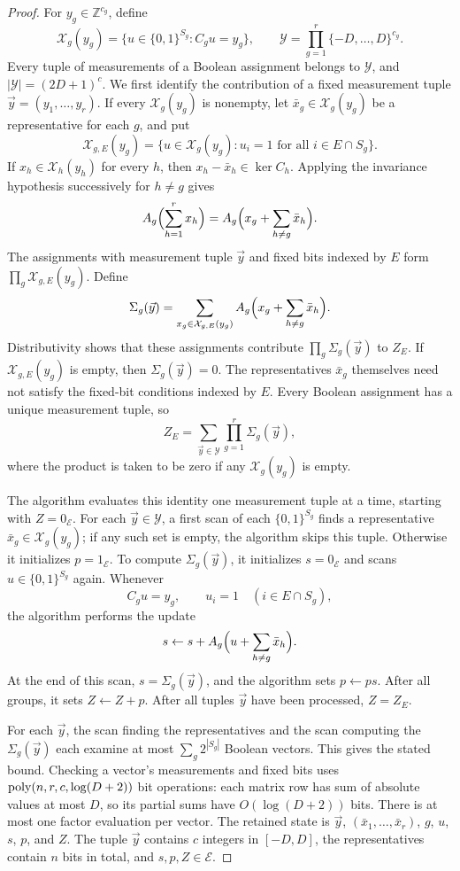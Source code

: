 \begin{proof}
For $y_g\in\mathbb Z^{c_g}$, define
\[
 \mathcal X_g(y_g)=\{u\in\{0,1\}^{S_g}:C_gu=y_g\},
 \qquad
 \mathcal Y=\prod_{g=1}^r\{-D,\ldots,D\}^{c_g}.
\]
Every tuple of measurements of a Boolean assignment belongs to
$\mathcal Y$, and $|\mathcal Y|=(2D+1)^c$.
We first identify the contribution of a fixed measurement tuple
$\vec y=(y_1,\ldots,y_r)$. If every $\mathcal X_g(y_g)$ is nonempty,
let $\bar x_g\in\mathcal X_g(y_g)$ be a representative for each $g$,
and put
\[
 \mathcal X_{g,E}(y_g)=
 \{u\in\mathcal X_g(y_g):u_i=1\text{ for all }i\in E\cap S_g\}.
\]
If $x_h\in\mathcal X_h(y_h)$ for every $h$, then
$x_h-\bar x_h\in\ker C_h$. Applying the invariance hypothesis
successively for $h\ne g$ gives
\[
 A_g\Bigl(\sum_{h=1}^r x_h\Bigr)
 =A_g\Bigl(x_g+\sum_{h\ne g}\bar x_h\Bigr).
\]
The assignments with measurement tuple $\vec y$ and fixed bits indexed
by $E$ form $\prod_g\mathcal X_{g,E}(y_g)$. Define
\begin{equation}\label{eq:group-sum}
 \Sigma_g(\vec y)=\sum_{x_g\in\mathcal X_{g,E}(y_g)}
       A_g\Bigl(x_g+\sum_{h\ne g}\bar x_h\Bigr).
\end{equation}
Distributivity shows that these assignments contribute
$\prod_g\Sigma_g(\vec y)$ to $Z_E$. If $\mathcal X_{g,E}(y_g)$ is empty,
then $\Sigma_g(\vec y)=0$. The representatives $\bar x_g$ themselves
need not satisfy the fixed-bit conditions indexed by $E$.
Every Boolean assignment has a unique measurement tuple, so
\[
 Z_E=\sum_{\vec y\in\mathcal Y}\prod_{g=1}^r\Sigma_g(\vec y),
\]
where the product is taken to be zero if any $\mathcal X_g(y_g)$
is empty.

The algorithm evaluates this identity one measurement tuple at a
time, starting with $Z=0_{\mathcal E}$. For each $\vec y\in\mathcal Y$,
a first scan of each $\{0,1\}^{S_g}$ finds a representative
$\bar x_g\in\mathcal X_g(y_g)$; if any such set is empty, the
algorithm skips this tuple. Otherwise it initializes
$p=1_{\mathcal E}$. To compute $\Sigma_g(\vec y)$, it initializes
$s=0_{\mathcal E}$ and scans $u\in\{0,1\}^{S_g}$ again. Whenever
\[
 C_gu=y_g,\qquad u_i=1\quad(i\in E\cap S_g),
\]
the algorithm performs the update
\[
 s\leftarrow s+A_g\Bigl(u+\sum_{h\ne g}\bar x_h\Bigr).
\]
At the end of this scan, $s=\Sigma_g(\vec y)$, and the algorithm sets
$p\leftarrow ps$. After all groups, it sets $Z\leftarrow Z+p$.
After all tuples $\vec y$ have been processed, $Z=Z_E$.

For each $\vec y$, the scan finding the representatives and the scan
computing the $\Sigma_g(\vec y)$ each examine at most
$\sum_g2^{|S_g|}$ Boolean vectors. This gives the stated bound.
Checking a vector's measurements and fixed bits uses
$\operatorname{poly}(n,r,c,\log(D+2))$ bit operations: each matrix row has sum of
absolute values at most $D$, so its partial sums have
$O(\log(D+2))$ bits. There is at most one factor evaluation per vector.
The retained state is $\vec y$, $(\bar x_1,\ldots,\bar x_r)$, $g$, $u$,
$s$, $p$, and $Z$. The tuple $\vec y$ contains $c$ integers in $[-D,D]$,
the representatives contain $n$ bits in total, and $s,p,Z\in\mathcal E$.
\end{proof}

